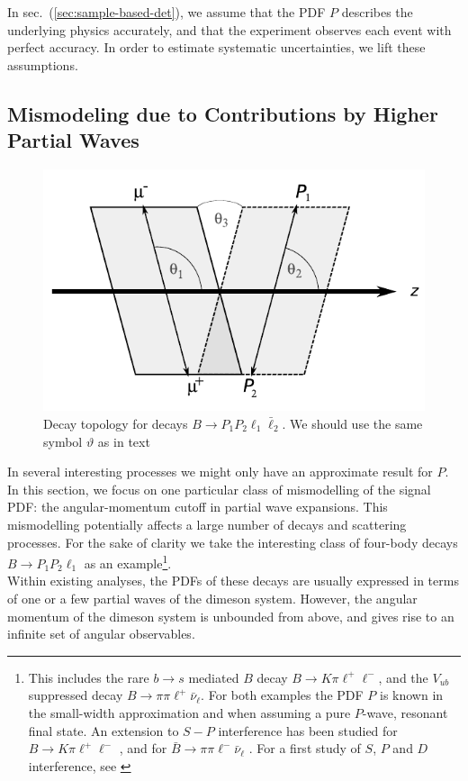 \documentclass[aps,prd,reprint,nofootinbib,preprintnumbers]{revtex4}
\newcommand{\refsec}[1]{sec.~(\ref{sec:#1})}
\renewcommand{\theta}{\vartheta}
\newcommand{\fred}[1]{{\color{brown!85!black}#1}}
\begin{document}
In \refsec{sample-based-det}, we assume that the PDF $P$ describes the underlying physics accurately,
and that the experiment observes each event with perfect accuracy. In order to estimate systematic
uncertainties, we lift these assumptions.

\subsection{Mismodeling due to Contributions by Higher Partial Waves}
\label{sec:systematics:partial-waves}

\begin{figure}
    \includegraphics[width=.6\textwidth]{fig-topology.pdf}
    \caption{Decay topology for decays $B\to P_1 P_2 \ell_1 \bar\ell_2$. \label{fig:topology}\fred{We should use the same symbol $\theta$ as in text}}
\end{figure}

In several interesting processes we might only have an approximate
result for $P$.  In this section, we focus on one particular class of
mismodelling of the signal PDF: the angular-momentum cutoff in partial
wave expansions. This mismodelling potentially affects a large number
of decays and scattering processes. For the sake of clarity we take
the interesting class of four-body decays $B\to P_1 P_2 \ell_1$
as an example\footnote{This includes the rare $b\to s$ mediated $B$ decay $B
  \to K\pi\ell^+\ell^-$, and the $V_{ub}$ suppressed decay $B\to
  \pi\pi\ell^+\bar\nu_\ell$. For both examples the PDF $P$ is known in
  the small-width approximation and when assuming a pure $P$-wave,
  resonant final state. An extension to $S-P$ interference has been
  studied for $B\to K\pi\ell^+\ell^-$
  \cite{Blake:2012mb,Becirevic:2011bp}, and for $\bar{B}\to
  \pi\pi\ell^-\bar\nu_\ell$ \cite{Faller:2013dwa}. For a first study
  of $S$, $P$
  and $D$ interference, see \cite{Das:2014sra}
}.\\

Within existing analyses, the PDFs of these decays are usually expressed in terms of one or a few
partial waves of the dimeson system. However, the angular momentum of the dimeson system is unbounded
from above, and gives rise to an infinite set of angular observables.\\
\end{document}
